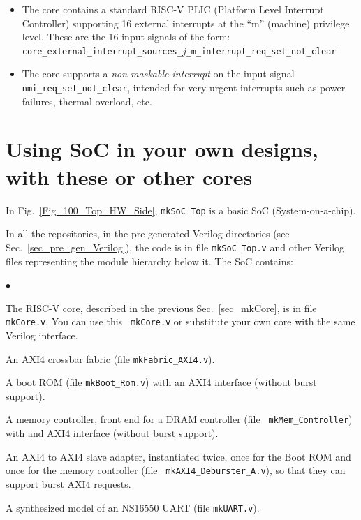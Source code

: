 \documentclass[11pt]{book}
\newenvironment{tightlist}%
{\begin{list}{$\bullet$}{%
    \setlength{\topsep}{0in}
    \setlength{\partopsep}{0in}
    \setlength{\itemsep}{0in}
    \setlength{\parsep}{0in}
    \setlength{\leftmargin}{1.5em}
    \setlength{\rightmargin}{0in}
    \setlength{\itemindent}{0in}
}
}%
{\end{list}
}
\newcommand{\cf}{\footnotesize\tt}
\begin{document}
\begin{itemize}
\item The core contains a standard RISC-V PLIC (Platform Level
  Interrupt Controller) supporting 16 external interrupts at the ``m''
  (machine) privilege level.  These are the 16 input signals of the form:
{\cf core\_external\_interrupt\_sources\_$j$\_m\_interrupt\_req\_set\_not\_clear}

\item The core supports a \emph{non-maskable interrupt} on the input
  signal {\cf nmi\_req\_set\_not\_clear}, intended for very urgent
  interrupts such as power failures, thermal overload, etc.

\end{itemize}


\section{Using SoC in your own designs, with these or other cores}

In Fig.~\ref{Fig_100_Top_HW_Side}, {\cf mkSoC\_Top} is a basic SoC
(System-on-a-chip).

In all the repositories, in the pre-generated Verilog directories (see
Sec.~\ref{sec_pre_gen_Verilog}), the code is in file {\cf mkSoC\_Top.v}
and other Verilog files representing the module hierarchy below it.
The SoC contains:

\begin{tightlist}

\item The RISC-V core, described in the previous
Sec.~\ref{sec_mkCore}, is in file {\cf mkCore.v}.  You can use this {\cf
mkCore.v} or substitute your own core with the same Verilog interface.

\item An AXI4 crossbar fabric (file {\cf mkFabric\_AXI4.v}).

\item A boot ROM (file {\cf mkBoot\_Rom.v}) with an AXI4 interface (without burst support).

\item A memory controller, front end for a DRAM controller (file {\cf
mkMem\_Controller}) with and AXI4 interface (without burst support).

\item An AXI4 to AXI4 slave adapter, instantiated twice, once for the
Boot ROM and once for the memory controller (file {\cf
mkAXI4\_Deburster\_A.v}), so that they can support burst AXI4
requests.

\item A synthesized model of an NS16550 UART (file {\cf mkUART.v}).

\end{tightlist}
\end{document}
